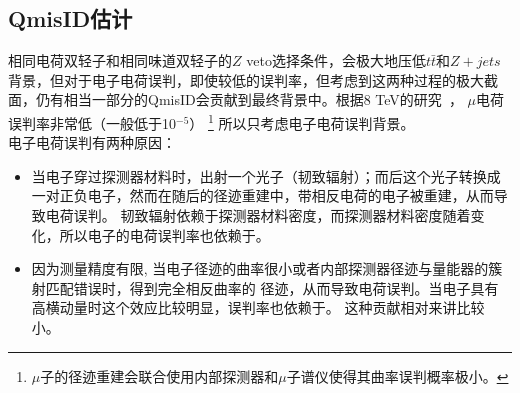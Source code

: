 \subsection{QmisID估计}\label{sec:QmisID_estimation}
相同电荷双轻子和相同味道双轻子的$Z$ veto选择条件，会极大地压低$t\bar{t}$和$Z+jets$背景，但对于电子电荷误判，即使较低的误判率，但考虑到这两种过程的极大截面，仍有相当一部分的QmisID会贡献到最终背景中。根据8 TeV的研究~\cite{MuonQmisIDnote}，
$\mu$电荷误判率非常低（一般低于10$^{-5}$）
\footnote{$\mu$子的径迹重建会联合使用内部探测器和$\mu$子谱仪使得其曲率误判概率极小。}
所以只考虑电子电荷误判背景。\\
电子电荷误判有两种原因：
\begin{itemize}
  \item 当电子穿过探测器材料时，出射一个光子（韧致辐射）；而后这个光子转换成一对正负电子，然而在随后的径迹重建中，带相反电荷的电子被重建，从而导致电荷误判。
韧致辐射依赖于探测器材料密度，而探测器材料密度随着\abseta 变化，所以电子的电荷误判率也依赖于\abseta。 
  \item 因为测量精度有限, 当电子径迹的曲率很小或者内部探测器径迹与量能器的簇射匹配错误时，得到完全相反曲率的
径迹，从而导致电荷误判。当电子具有高横动量时这个效应比较明显，误判率也依赖于\pt。
 这种贡献相对来讲比较小。
\end{itemize}
